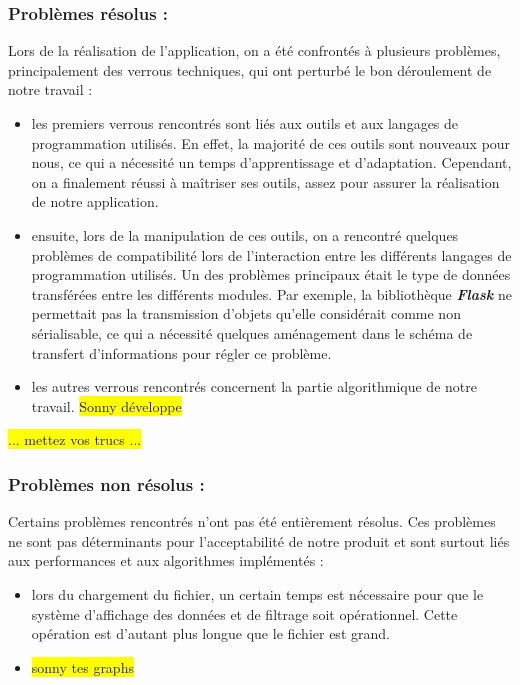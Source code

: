 			\subsubsection*{Problèmes résolus :} 
			Lors de la réalisation de l'application, on a été confrontés à plusieurs problèmes, principalement des verrous techniques, qui ont perturbé le bon déroulement de notre travail : 
			\begin{itemize}[leftmargin=*]
				\item les premiers verrous rencontrés sont liés aux outils et aux langages de programmation utilisés. En effet, la majorité de ces outils sont nouveaux pour nous, ce qui a nécessité un temps d'apprentissage et d'adaptation. Cependant, on a finalement réussi à maîtriser ses outils, assez pour assurer la réalisation de notre application.
				\item ensuite, lors de la manipulation de ces outils, on a rencontré quelques problèmes de compatibilité lors de l'interaction entre les différents langages de programmation utilisés. Un des problèmes principaux était le type de données transférées entre les différents modules. Par exemple, la bibliothèque \textit{\textbf{Flask}} ne permettait pas la transmission d'objets qu'elle considérait comme non sérialisable, ce qui a nécessité quelques aménagement dans le schéma de transfert d'informations pour régler ce problème.
				\item les autres verrous rencontrés concernent la partie algorithmique de notre travail. \colorbox{yellow}{Sonny développe}
			\end{itemize}
				\colorbox{yellow}{... mettez vos trucs ...}
				
			\subsubsection*{Problèmes non résolus :}
				Certains problèmes rencontrés n'ont pas été entièrement résolus. Ces problèmes ne sont pas déterminants pour l'acceptabilité de notre produit et sont surtout liés aux performances et aux algorithmes implémentés :
				\begin{itemize}[leftmargin=*]
					\item lors du chargement du fichier, un certain temps est nécessaire pour que le système d'affichage des données et de filtrage soit opérationnel. Cette opération est d'autant plus longue que le fichier est grand.
					\item \colorbox{yellow}{sonny tes graphs}
				\end{itemize}
				
